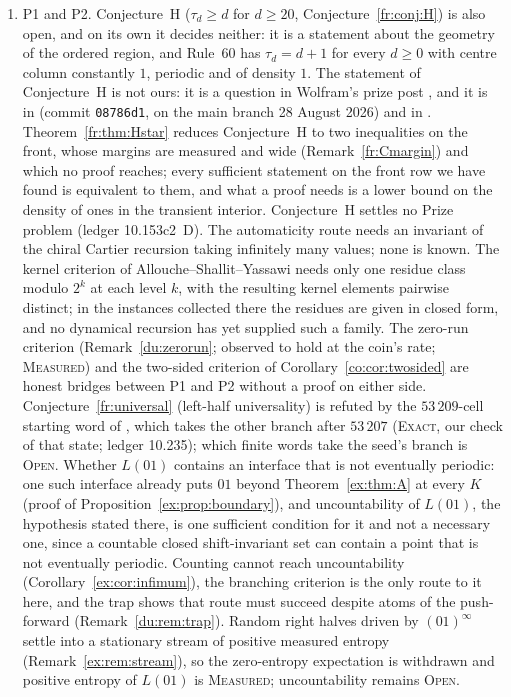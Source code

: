 \documentclass[11pt]{article}
\theoremstyle{definition}
\theoremstyle{remark}
\newcommand{\EXACT}{\textsc{Exact}}
\newcommand{\MEASURED}{\textsc{Measured}}
\newcommand{\OPEN}{\textsc{Open}}
\begin{document}
\begin{enumerate}[nosep]
\item[\OPEN] P1 and P2. Conjecture~H ($\tau_d\ge d$ for $d\ge20$, Conjecture~\ref{fr:conj:H}) is also open, and on its own it decides neither: it is a statement about the geometry of the ordered region, and Rule~$60$ has $\tau_d=d+1$ for every $d\ge0$ with centre column constantly $1$, periodic and of density $1$. The statement of Conjecture~H is not ours: it is a question in Wolfram's prize post \cite{Wolfram}, and it is in \cite{Pat} (commit \texttt{08786d1}, on the main branch 28 August 2026) and in \cite{Dib}. Theorem~\ref{fr:thm:Hstar} reduces Conjecture~H to two inequalities on the front, whose margins are measured and wide (Remark~\ref{fr:Cmargin}) and which no proof reaches; every sufficient statement on the front row we have found is equivalent to them, and what a proof needs is a lower bound on the density of ones in the transient interior. Conjecture~H settles no Prize problem (ledger 10.153c2~D). The automaticity route needs an invariant of the chiral Cartier recursion taking infinitely many values; none is known. The kernel criterion of Allouche--Shallit--Yassawi \cite[Thm.~1]{ASY} needs only one residue class modulo $2^{k}$ at each level $k$, with the resulting kernel elements pairwise distinct; in the instances collected there the residues are given in closed form, and no dynamical recursion has yet supplied such a family. The zero-run criterion (Remark~\ref{du:zerorun}; observed to hold at the coin's rate; \MEASURED) and the two-sided criterion of Corollary~\ref{co:cor:twosided} are honest bridges between P1 and P2 without a proof on either side. Conjecture~\ref{fr:universal} (left-half universality) is refuted by the $53\,209$-cell starting word of \cite{Lania}, which takes the other branch after $53\,207$ (\EXACT, our check of that state; ledger 10.235); which finite words take the seed's branch is \OPEN. Whether $L(01)$ contains an interface that is not eventually periodic: one such interface already puts $01$ beyond Theorem~\ref{ex:thm:A} at every $K$ (proof of Proposition~\ref{ex:prop:boundary}), and uncountability of $L(01)$, the hypothesis stated there, is one sufficient condition for it and not a necessary one, since a countable closed shift-invariant set can contain a point that is not eventually periodic. Counting cannot reach uncountability (Corollary~\ref{ex:cor:infimum}), the branching criterion is the only route to it here, and the trap shows that route must succeed despite atoms of the push-forward (Remark~\ref{du:rem:trap}). Random right halves driven by $(01)^\infty$ settle into a stationary stream of positive measured entropy (Remark~\ref{ex:rem:stream}), so the zero-entropy expectation is withdrawn and positive entropy of $L(01)$ is \MEASURED; uncountability remains \OPEN.

\end{enumerate}
\end{document}
